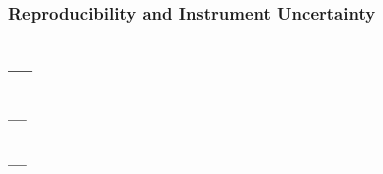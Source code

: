 \documentclass[fleqn]{beamer} %
\newcommand{\sectionIIIsubsectionIIItitle}{Reproducibility and Instrument Uncertainty}
\newcommand{\sectionIIIsubsectionIVtitle}{---}
\begin{document}
			\begin{frame}
				\frametitle{\sectionIIIsubsectionIIItitle}



			\end{frame}

		\subsection{\sectionIIIsubsectionIVtitle}\label{sectionIIIsubsectionIV}	

			\begin{frame}
				\frametitle{\sectionIIIsubsectionIVtitle}

			


			\end{frame}

			\begin{frame}
				\frametitle{\sectionIIIsubsectionIVtitle}
				


			\end{frame}
\end{document}
